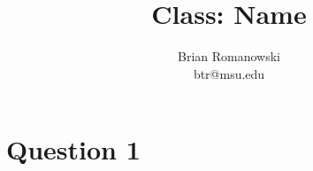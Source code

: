 \documentclass[10pt]{article}
\begin{document}
\title{Class: Name} 

\author{Brian Romanowski\\
btr@msu.edu} 

\maketitle




\section*{Question 1}
\end{document}
